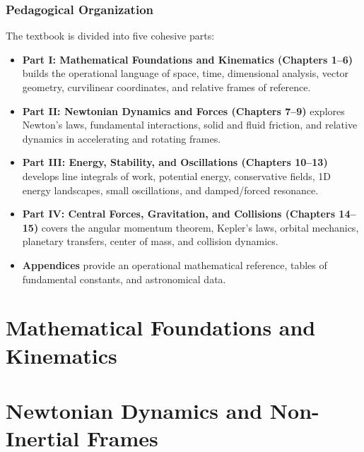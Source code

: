 \documentclass[11pt,oneside,openany]{book}
\begin{document}
\section*{Pedagogical Organization}

The textbook is divided into five cohesive parts:
\begin{itemize}[leftmargin=1.5em,itemsep=3pt]
  \item \textbf{Part I: Mathematical Foundations and Kinematics (Chapters 1--6)} builds the operational language of space, time, dimensional analysis, vector geometry, curvilinear coordinates, and relative frames of reference.
  \item \textbf{Part II: Newtonian Dynamics and Forces (Chapters 7--9)} explores Newton's laws, fundamental interactions, solid and fluid friction, and relative dynamics in accelerating and rotating frames.
  \item \textbf{Part III: Energy, Stability, and Oscillations (Chapters 10--13)} develops line integrals of work, potential energy, conservative fields, 1D energy landscapes, small oscillations, and damped/forced resonance.
  \item \textbf{Part IV: Central Forces, Gravitation, and Collisions (Chapters 14--15)} covers the angular momentum theorem, Kepler's laws, orbital mechanics, planetary transfers, center of mass, and collision dynamics.
  \item \textbf{Appendices} provide an operational mathematical reference, tables of fundamental constants, and astronomical data.
\end{itemize}

\tableofcontents

\mainmatter
\pagestyle{fancy}

\part{Mathematical Foundations and Kinematics}








\part{Newtonian Dynamics and Non-Inertial Frames}




\end{document}
